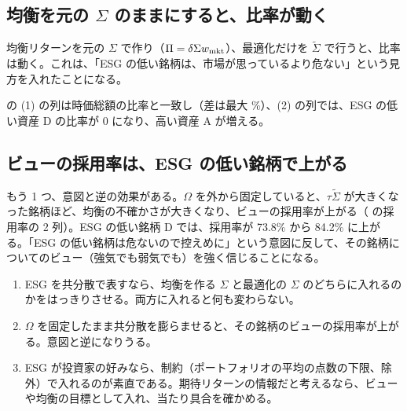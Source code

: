 \subsection*{均衡を元の $\Sigma$ のままにすると、比率が動く}

均衡リターンを元の $\Sigma$ で作り（$\Pi=\delta\Sigma w_{\mathrm{mkt}}$）、最適化だけを $\tilde\Sigma$ で行うと、比率は動く。これは、「ESG の低い銘柄は、市場が思っているより危ない」という見方を入れたことになる。

\begin{table}[htbp]
\centering
\caption{4 資産の例（標準偏差 20〜30\%、相関 0.5、$\delta=2.5$）。(1) 均衡も最適化も $\tilde\Sigma$、(2) 均衡は $\Sigma$、最適化は $\tilde\Sigma$（空売りなし・全額投資）。採用率は、各資産に絶対ビューを 1 つずつ置き、$\omega=0.04^2$、$\tau=0.05$ で固定したときの 1 資産あたりの値。右端は Alpern--Rachev の比率の混合（$\lambda=0.25$）。}
\label{tab:esg}
\end{table}

 の (1) の列は時価総額の比率と一致し（差は最大 \%）、(2) の列では、ESG の低い資産 D の比率が 0 になり、高い資産 A が増える。

\subsection*{ビューの採用率は、ESG の低い銘柄で上がる}

もう 1 つ、意図と逆の効果がある。$\Omega$ を外から固定していると、$\tau\tilde\Sigma$ が大きくなった銘柄ほど、均衡の不確かさが大きくなり、ビューの採用率が上がる（ の採用率の 2 列）。ESG の低い銘柄 D では、採用率が 73.8\% から 84.2\% に上がる。「ESG の低い銘柄は危ないので控えめに」という意図に反して、その銘柄についてのビュー（強気でも弱気でも）を強く信じることになる。

\begin{tipbox}
\begin{enumerate}
\item ESG を共分散で表すなら、均衡を作る $\Sigma$ と最適化の $\Sigma$ のどちらに入れるのかをはっきりさせる。両方に入れると何も変わらない。
\item $\Omega$ を固定したまま共分散を膨らませると、その銘柄のビューの採用率が上がる。意図と逆になりうる。
\item ESG が投資家の好みなら、制約（ポートフォリオの平均の点数の下限、除外）で入れるのが素直である。期待リターンの情報だと考えるなら、ビューや均衡の目標として入れ、当たり具合を確かめる。
\end{enumerate}
\end{tipbox}

